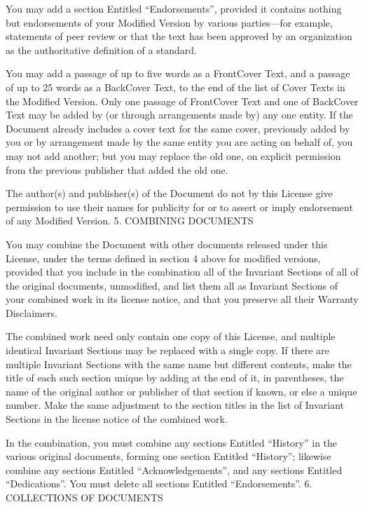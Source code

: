 \documentclass[letterpaper,10pt,english]{sphinxmanual}
\begin{document}
\sphinxAtStartPar
You may add a section Entitled “Endorsements”, provided it contains nothing but endorsements of your Modified Version by various parties—for example, statements of peer review or that the text has been approved by an organization as the authoritative definition of a standard.

\sphinxAtStartPar
You may add a passage of up to five words as a Front\sphinxhyphen{}Cover Text, and a passage of up to 25 words as a Back\sphinxhyphen{}Cover Text, to the end of the list of Cover Texts in the Modified Version. Only one passage of Front\sphinxhyphen{}Cover Text and one of Back\sphinxhyphen{}Cover Text may be added by (or through arrangements made by) any one entity. If the Document already includes a cover text for the same cover, previously added by you or by arrangement made by the same entity you are acting on behalf of, you may not add another; but you may replace the old one, on explicit permission from the previous publisher that added the old one.

\sphinxAtStartPar
The author(s) and publisher(s) of the Document do not by this License give permission to use their names for publicity for or to assert or imply endorsement of any Modified Version.
5. COMBINING DOCUMENTS

\sphinxAtStartPar
You may combine the Document with other documents released under this License, under the terms defined in section 4 above for modified versions, provided that you include in the combination all of the Invariant Sections of all of the original documents, unmodified, and list them all as Invariant Sections of your combined work in its license notice, and that you preserve all their Warranty Disclaimers.

\sphinxAtStartPar
The combined work need only contain one copy of this License, and multiple identical Invariant Sections may be replaced with a single copy. If there are multiple Invariant Sections with the same name but different contents, make the title of each such section unique by adding at the end of it, in parentheses, the name of the original author or publisher of that section if known, or else a unique number. Make the same adjustment to the section titles in the list of Invariant Sections in the license notice of the combined work.

\sphinxAtStartPar
In the combination, you must combine any sections Entitled “History” in the various original documents, forming one section Entitled “History”; likewise combine any sections Entitled “Acknowledgements”, and any sections Entitled “Dedications”. You must delete all sections Entitled “Endorsements”.
6. COLLECTIONS OF DOCUMENTS
\end{document}

